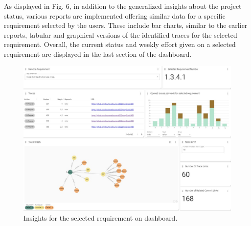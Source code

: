 \documentclass[conference]{IEEEtran}
\begin{document}
As displayed in Fig. 6, in addition to the generalized insights about the project status, various reports are implemented offering similar data for a specific requirement selected by the users. These include bar charts, similar to the earlier reports, tabular and graphical versions of the identified traces for the selected requirement. Overall, the current status and weekly effort given on a selected requirement are displayed in the last section of the dashboard.

\begin{figure}[htb]
    \centering
    \includegraphics[width=0.9\linewidth]{figs/perreq.jpg}
    \caption{Insights for the selected requirement on dashboard.}
    \label{fig:enter-label}
\end{figure}




\end{document}

